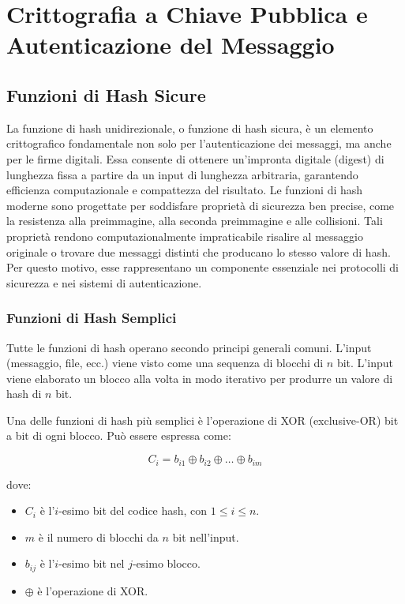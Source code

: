 \chapter{Crittografia a Chiave Pubblica e Autenticazione del Messaggio}

\section{Funzioni di Hash Sicure}

La funzione di hash unidirezionale, o funzione di hash sicura, è un elemento crittografico fondamentale non solo per l'autenticazione dei messaggi, ma anche per le firme digitali. Essa consente di ottenere un'impronta digitale (digest) di lunghezza fissa a partire da un input di lunghezza arbitraria, garantendo efficienza computazionale e compattezza del risultato. Le funzioni di hash moderne sono progettate per soddisfare proprietà di sicurezza ben precise, come la resistenza alla preimmagine, alla seconda preimmagine e alle collisioni. Tali proprietà rendono computazionalmente impraticabile risalire al messaggio originale o trovare due messaggi distinti che producano lo stesso valore di hash. Per questo motivo, esse rappresentano un componente essenziale nei protocolli di sicurezza e nei sistemi di autenticazione.

\subsection{Funzioni di Hash Semplici}
Tutte le funzioni di hash operano secondo principi generali comuni. L'input (messaggio, file, ecc.) viene visto come una sequenza di blocchi di $n$ bit. L'input viene elaborato un blocco alla volta in modo iterativo per produrre un valore di hash di $n$ bit.

Una delle funzioni di hash più semplici è l'operazione di XOR (exclusive-OR) bit a bit di ogni blocco. Può essere espressa come:

$$C_i = b_{i1} \oplus b_{i2} \oplus \dots \oplus b_{im}$$

dove:
\begin{itemize}
    \item $C_i$ è l'$i$-esimo bit del codice hash, con $1 \le i \le n$.
    \item $m$ è il numero di blocchi da $n$ bit nell'input.
    \item $b_{ij}$ è l'$i$-esimo bit nel $j$-esimo blocco.
    \item $\oplus$ è l'operazione di XOR.
\end{itemize}

